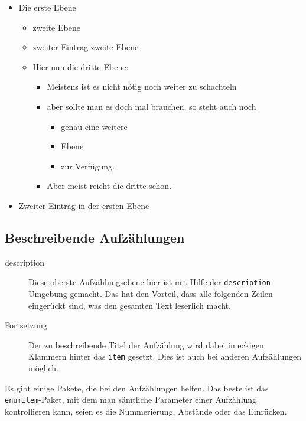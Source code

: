 \begin{itemize}
   \item Die erste Ebene 
   \begin{itemize}
    \item zweite Ebene
    \item zweiter Eintrag zweite Ebene
    \item Hier nun die dritte Ebene:
      \begin{itemize}
        \item Meistens ist es nicht nötig noch weiter zu schachteln
        \item aber sollte man es doch mal brauchen, so steht auch noch 
         \begin{itemize}
           \item genau eine weitere 
           \item Ebene 
           \item zur Verfügung.
         \end{itemize}
        \item Aber meist reicht die dritte schon.  
      \end{itemize}
    \end{itemize}
  \item Zweiter Eintrag in der ersten Ebene
 \end{itemize}

\subsection{Beschreibende Aufzählungen}

\begin{description}
\item[description] Diese oberste Aufzählungsebene hier ist mit Hilfe der \texttt{description}-Umgebung gemacht. Das hat den Vorteil, dass alle folgenden Zeilen eingerückt sind, was den gesamten Text leserlich macht. 
\item[Fortsetzung] Der zu beschreibende Titel der Aufzählung wird dabei in eckigen Klammern hinter das \texttt{item} gesetzt. Dies ist auch bei anderen Aufzählungen möglich.
\end{description}

Es gibt einige Pakete, die bei den Aufzählungen helfen. Das beste ist das \texttt{enumitem}-Paket, mit dem man sämtliche Parameter einer Aufzählung kontrollieren kann, seien es die Nummerierung, Abstände oder das Einrücken. 

